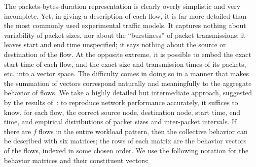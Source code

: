 \documentclass[conference]{IEEEtran}
\begin{document}

The {packets-bytes-duration} representation is clearly overly simplistic and very incomplete. Yet, in giving a description of each flow, it is far more detailed than the most commonly used experimental traffic models. It captures nothing about variability of packet sizes, nor about the ``burstiness'' of packet transmissions; it leaves start and end time unspecified; it says nothing about the source or destination of the flow. At the opposite extreme, it is possible to embed the exact start time of each flow, and the exact size and transmission times of its packets, etc. into a vector space. The difficulty comes in doing so in a manner that makes the summation of vectors correspond naturally and meaningfully to the aggregate behavior of flows. We take a highly detailed but intermediate approach, suggested by the results of~\cite{Karpinski07:realism}: to reproduce network performance accurately, it suffices to know, for each flow, the correct source node, destination node, start time, end time, and empirical distributions of packet sizes and inter-packet intervals. If there are $f$ flows in the entire workload pattern, then the collective behavior can be described with six matrices; the rows of each matrix are the behavior vectors of the flows, indexed in some chosen order. We use the following notation for the behavior matrices and their constituent vectors:\vspace{-0.25em}
\end{document}

